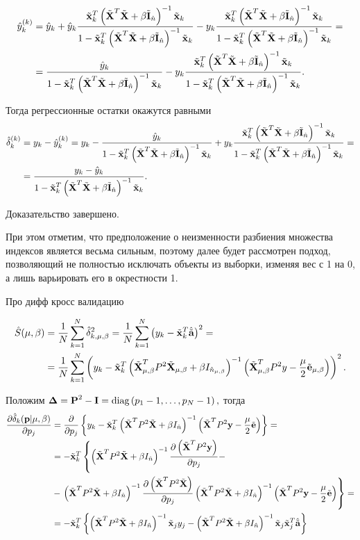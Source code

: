 \begin{Proof}

\begin{align*}
	\hat y\this_k
		&= \hat y_k + \hat y_k\frac{\tilde{\mb x}_k^T\inv{\A} \tilde{\mb x}_k}{\denominator}
		- y_k\frac{\tilde{\mb x}^T_k\inv{\A}\tilde{\mb x}_k}{\denominator} = \\
		&= \frac{\hat y_k}{\denominator} - y_k\frac{\tilde{\mb x}^T_k\inv{\A}\tilde{\mb x}_k}{\denominator}.
\end{align*}

Тогда регрессионные остатки окажутся равными
\begin{align*}
	\hat{\delta}_k\this
	&= y_k - \hat y\this_k = y_k - \frac{\hat y_k}{\denominator} + y_k\frac{\tilde{\mb x}^T_k\inv{\A}\tilde{\mb x}_k}{\denominator} = \\
	&= \frac{y_k - \hat y_k}{\denominator}.
\end{align*}

Доказательство завершено.
\end{Proof}

При этом отметим, что предположение о неизменности разбиения множества индексов является весьма сильным, 
поэтому далее будет рассмотрен подход, позволяющий не полностью исключать объекты из выборки, изменяя вес с 1 на 0, 
а лишь варьировать его в окрестности 1.

\begin{theorem}
Про дифф кросс валидацию
\end{theorem}

\begin{align}
	\hat S(\lams)
	&= \frac1N\suml_{k=1}^N\hat\delta_{k, \lams}^2
	= \frac1N\suml_{k=1}^N\cbr{y_k - \tilde {\mb x}_k^T \besta}^2 = \\
	&= \frac1N\suml_{k=1}^N
		\cbr{y_k - \tilde {\mb x}_k^T
		\inv{\tilde{\mb X}^T_\lams P^2\tilde{\mb X}_\lams + \beta I_{\hat n_\lams}}
		\cbr{\tilde{\mb X}^T_\lams P^2 y - \frac\mu2\tilde{\mb e}_\lams}
	}^2.
\end{align}

Положим $\mb \Delta = \mb P^2 - \mb I = \diag{p_1 - 1, \ldots, p_N - 1},$ тогда
\begin{align}
	\dd{\hat\delta_k(\mb p \cond \lams)}{p_j}
	&= 	\dd{}{p_j}
		\fbr{
			y_k - \tilde {\mb x}_k^T \inv{\tilde{\mb X}^T P^2\tilde{\mb X} + \beta I_{\hat n}}
			\cbr{\tilde{\mb X}^T P^2 \mb y -\frac\mu2\tilde{\mb e}}
		} = \\
	&= - \tilde {\mb x}_k^T
	\left\{
		\inv{\tilde{\mb X}^T P^2\tilde{\mb X} + \beta I_{\hat n}}
	  	\dd{\cbr{\tilde{\mb X}^T P^2 \mb y}}{p_j} -
	  	\right. \\
	&- 	\left.
	   	\inv{\tilde{\mb X}^T P^2\tilde{\mb X} + \beta I_{\hat n}}
		\dd{\cbr{\tilde{\mb X}^T P^2\tilde{\mb X}}}{p_j}
		\inv{\tilde{\mb X}^T P^2\tilde{\mb X} + \beta I_{\hat n}}
		\cbr{\tilde{\mb X}^T P^2 \mb y -\frac\mu2\tilde{\mb e}}
	\right\} = \\
	&= - \tilde {\mb x}_k^T
	\fbr{
		\inv{\tilde{\mb X}^T P^2\tilde{\mb X} + \beta I_{\hat n}}
		\tilde{\mb x}_jy_j
		-
		\inv{\tilde{\mb X}^T P^2\tilde{\mb X} + \beta I_{\hat n}}
		\tilde{\mb x}_j \tilde{\mb x}^T_j
		\besta
	}
\end{align}

